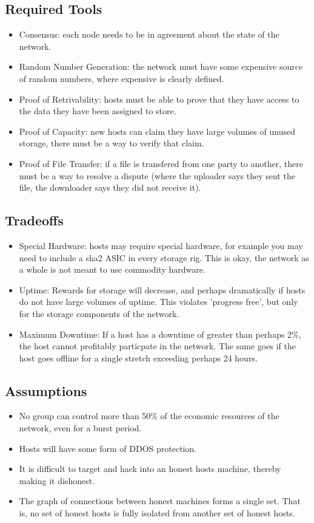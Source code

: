 \documentclass[twocolumn]{article}
\begin{document}
\subsection{Required Tools}
\begin{itemize}
	\item Consensus: each node needs to be in agreement about the state of the network.
	\item Random Number Generation: the network must have some expensive source of random numbers, where expensive is clearly defined.
	\item Proof of Retrivability: hosts must be able to prove that they have access to the data they have been assigned to store.
	\item Proof of Capacity: new hosts can claim they have large volumes of unused storage, there must be a way to verify that claim.
	\item Proof of File Transfer: if a file is transfered from one party to another, there must be a way to resolve a dispute (where the uploader says they sent the file, the downloader says they did not receive it).
\end{itemize}

\subsection{Tradeoffs}
\begin{itemize}
	\item Special Hardware: hosts may require special hardware, for example you may need to include a sha2 ASIC in every storage rig. This is okay, the network as a whole is not meant to use commodity hardware.
	\item Uptime: Rewards for storage will decrease, and perhaps dramatically if hosts do not have large volumes of uptime. This violates 'progress free', but only for the storage components of the network.
	\item Maximum Downtime: If a host has a downtime of greater than perhaps 2\%, the host cannot profitably particpate in the network. The same goes if the host goes offline for a single stretch exceeding perhaps 24 hours.
\end{itemize}

\subsection{Assumptions}
\begin{itemize}
	\item No group can control more than 50\% of the economic resources of the network, even for a burst period.
	\item Hosts will have some form of DDOS protection.
	\item It is difficult to target and hack into an honest hosts machine, thereby making it dishonest.
	\item The graph of connections between honest machines forms a single set. That is, no set of honest hosts is fully isolated from another set of honest hosts.
\end{itemize}
\end{document}
